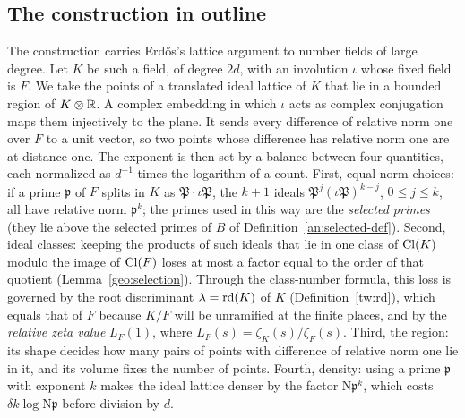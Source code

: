 \subsection{The construction in outline}\label{intro:outline}
The construction carries Erd\H{o}s's lattice argument to number fields
of large degree. Let $K$ be such a field, of degree $2d$, with an
involution $\iota$ whose fixed field is $F$. We take the points of a
translated ideal lattice of $K$ that lie in a bounded region of
$K\otimes\mathbb R$. A complex embedding in which $\iota$ acts as complex
conjugation maps them injectively to the plane. It sends every
difference of relative norm one over $F$ to a unit vector, so two points
whose difference has relative norm one are at distance one. The
exponent is then set by a balance between four quantities, each
normalized as $d^{-1}$ times the logarithm of a count. First,
equal-norm choices: if a prime $\mathfrak p$ of $F$ splits in $K$ as
$\mathfrak P\cdot\iota\mathfrak P$, the $k+1$ ideals
$\mathfrak P^j(\iota\mathfrak P)^{k-j}$, $0\le j\le k$, all have
relative norm $\mathfrak p^k$; the primes used in this way are the
\emph{selected primes} (they lie above the selected primes of $B$ of
Definition~\ref{an:selected-def}). Second, ideal classes: keeping the products of
such ideals that lie in one class of $\operatorname{Cl}(K)$ modulo the image of
$\operatorname{Cl}(F)$ loses at most a factor equal to the order of that quotient
(Lemma~\ref{geo:selection}). Through the class-number formula, this loss
is governed by the root discriminant $\lambda=\operatorname{rd}(K)$ of $K$
(Definition~\ref{tw:rd}), which equals that of $F$ because $K/F$ will be
unramified at the finite places, and by the
\emph{relative zeta value} $L_F(1)$, where $L_F(s)=\zeta_K(s)/\zeta_F(s)$.
Third, the region: its shape decides how many pairs of points with
difference of relative norm one lie in it, and its volume fixes the
number of points. Fourth, density: using a prime $\mathfrak p$ with
exponent $k$ makes the ideal lattice denser by the factor
$\mathrm N\mathfrak p^k$, which costs $\delta k\log\mathrm N\mathfrak p$ before
division by $d$.

